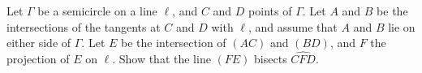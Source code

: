 Let $\Gamma$ be a semicircle on a line $\ell$, and $C$ and $D$ points of $\Gamma$. Let $A$ and $B$ be the intersections of the tangents at $C$ and $D$ with $\ell$, and assume that $A$ and $B$ lie on either side of $\Gamma$. Let $E$ be the intersection of $(AC)$ and $(BD)$, and $F$ the projection of $E$ on $\ell$. Show that the line $(FE)$ bisects $\widehat{CFD}$.
